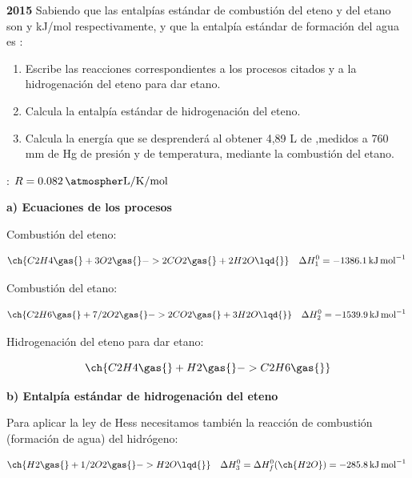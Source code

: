 \begin{exerciseEVAU}
    \textbf{2015} Sabiendo que las entalpías estándar de combustión del eteno y del etano son  y  kJ/mol respectivamente, y que la entalpía estándar de formación del agua es :
    \begin{enumerate}[label=\letraminuscula]
    \item Escribe las reacciones correspondientes a los procesos citados y a la hidrogenación del eteno para dar etano.
    \item Calcula la entalpía estándar de hidrogenación del eteno.
    \item  Calcula la energía que se desprenderá al obtener 4,89 L de ,medidos a 760 mm de Hg de presión y  de temperatura, mediante la combustión del etano.
    \end{enumerate}
    \datos{}: \(R = \ctegases\)
    \begin{solu}

        \textbf{a) Ecuaciones de los procesos}

        Combustión del eteno:

        \begin{equation*}
            \ch{C2H4 \gas{} + 3 O2 \gas{} -> 2 CO2 \gas{} + 2 H2O \lqd{}} \quad \Delta H^0_1 = \energia[kjmol]{-1386.1}
        \end{equation*}

        Combustión del etano:

        \begin{equation*}
            \ch{C2H6 \gas{} + 7/2 O2 \gas{} -> 2 CO2 \gas{} + 3 H2O \lqd{}} \quad \Delta H^0_2 = \energia[kjmol]{-1539.9}
        \end{equation*}

        Hidrogenación del eteno para dar etano:

        \begin{equation*}
            \ch{C2H4 \gas{} + H2 \gas{} -> C2H6 \gas{}}
        \end{equation*}

        \textbf{b) Entalpía estándar de hidrogenación del eteno}

        Para aplicar la ley de Hess necesitamos también la reacción de combustión (formación de agua) del hidrógeno:

        \begin{equation*}
            \ch{H2 \gas{} + 1/2 O2 \gas{} -> H2O \lqd{}} \quad \Delta H^0_3 = \Delta H^0_f (\ch{H2O}) = \energia[kjmol]{-285.8}
        \end{equation*}


\end{solu}
\end{exerciseEVAU}
